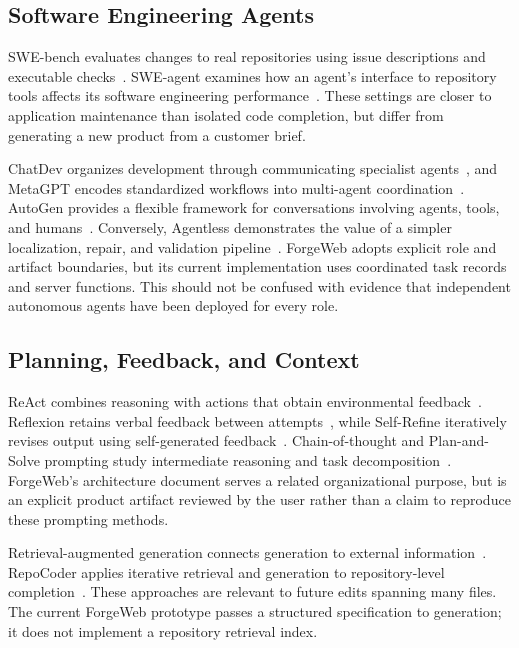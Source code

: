 \documentclass[conference,a4paper]{IEEEtran}
\begin{document}
\subsection{Software Engineering Agents}
SWE-bench evaluates changes to real repositories using issue descriptions and executable checks~\cite{jimenez2024swebench}. SWE-agent examines how an agent's interface to repository tools affects its software engineering performance~\cite{yang2024sweagent}. These settings are closer to application maintenance than isolated code completion, but differ from generating a new product from a customer brief.

ChatDev organizes development through communicating specialist agents~\cite{qian2024chatdev}, and MetaGPT encodes standardized workflows into multi-agent coordination~\cite{hong2023metagpt}. AutoGen provides a flexible framework for conversations involving agents, tools, and humans~\cite{wu2023autogen}. Conversely, Agentless demonstrates the value of a simpler localization, repair, and validation pipeline~\cite{xia2024agentless}. ForgeWeb adopts explicit role and artifact boundaries, but its current implementation uses coordinated task records and server functions. This should not be confused with evidence that independent autonomous agents have been deployed for every role.

\subsection{Planning, Feedback, and Context}
ReAct combines reasoning with actions that obtain environmental feedback~\cite{yao2023react}. Reflexion retains verbal feedback between attempts~\cite{shinn2023reflexion}, while Self-Refine iteratively revises output using self-generated feedback~\cite{madaan2023selfrefine}. Chain-of-thought and Plan-and-Solve prompting study intermediate reasoning and task decomposition~\cite{wei2022cot,wang2023plansolve}. ForgeWeb's architecture document serves a related organizational purpose, but is an explicit product artifact reviewed by the user rather than a claim to reproduce these prompting methods.

Retrieval-augmented generation connects generation to external information~\cite{lewis2020rag}. RepoCoder applies iterative retrieval and generation to repository-level completion~\cite{zhang2023repocoder}. These approaches are relevant to future edits spanning many files. The current ForgeWeb prototype passes a structured specification to generation; it does not implement a repository retrieval index.
\end{document}
